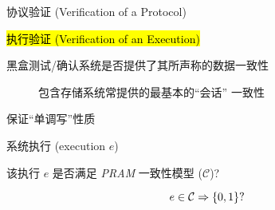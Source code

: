 
\begin{frame}{}
  \begin{center}
    \vspace{0.50cm}
    协议验证 (Verification of a Protocol) \\[5pt]
     

    \vspace{0.30cm}
    \hl{执行验证 (Verification of an Execution)}

    \pause
    \vspace{0.50cm}

    
    \vspace{0.30cm}
    {黑盒测试/确认系统是否提供了其所声称的数据一致性}

     
  \end{center}
\end{frame}

\begin{frame}{}
  \begin{description}
    \item[] 包含存储系统常提供的最基本的``会话''  一致性

	 
  \end{description}

  \vspace{-0.10cm}
  {\centerline{\PRAM{} 保证``单调写''性质}}
\end{frame}

\begin{frame}{}
  \begin{cdef}
    \vspace{8pt}
    \begin{description}
      \setlength{\itemsep}{8pt}
      \item[实例:] 系统执行 {\small (execution $e$)}
      \item[问题:] 该执行 $e$ 是否满足 \emph{PRAM} 一致性模型 {\small ($\mathcal{C}$)}? 
    \end{description}    

    \[
      e \in \mathcal{C} \Rightarrow \{0,1\}?
    \]
  \end{cdef}
\end{frame}


